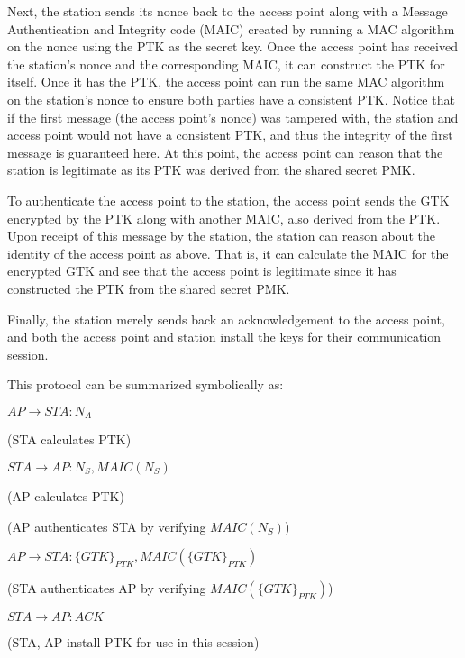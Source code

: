 \documentclass[11pt, twocolumn]{article} %
\begin{document}
{Next, the station sends its nonce back to the access point along with a Message Authentication and Integrity code (MAIC) created by running a MAC algorithm on the nonce using the PTK as the secret key.  Once the access point has received the station's nonce and the corresponding MAIC, it can construct the PTK for itself.  Once it has the PTK, the access point can run the same MAC algorithm on the station's nonce to ensure both parties have a consistent PTK.  Notice that if the first message (the access point's nonce) was tampered with, the station and access point would not have a consistent PTK, and thus the integrity of the first message is guaranteed here.  At this point, the access point can reason that the station is legitimate as its PTK was derived from the shared secret PMK.  

To authenticate the access point to the station, the access point sends the GTK encrypted by the PTK along with another MAIC, also derived from the PTK.  Upon receipt of this message by the station, the station can reason about the identity of the access point as above.  That is, it can calculate the MAIC for the encrypted GTK and see that the access point is legitimate since it has constructed the PTK from the shared secret PMK.  

Finally, the station merely sends back an acknowledgement to the access point, and both the access point and station install the keys for their communication session.  

This protocol can be summarized symbolically as: 

\begin{enumerate}[leftmargin=5mm]
{\small
\item $AP \rightarrow STA: N_A$

{\tiny (STA calculates PTK)}

\item $STA \rightarrow AP: N_S, MAIC(N_S)$

{\tiny (AP calculates PTK)

(AP authenticates STA by verifying $MAIC(N_S)$) }

\item $AP \rightarrow STA: \{GTK\}_{PTK}, MAIC(\{GTK\}_{PTK})$

{\tiny (STA authenticates AP by verifying $MAIC(\{GTK\}_{PTK})$) }

\item $STA \rightarrow AP: ACK$

{\tiny (STA, AP install PTK for use in this session) }
}
\end{enumerate}


}
\end{document}
